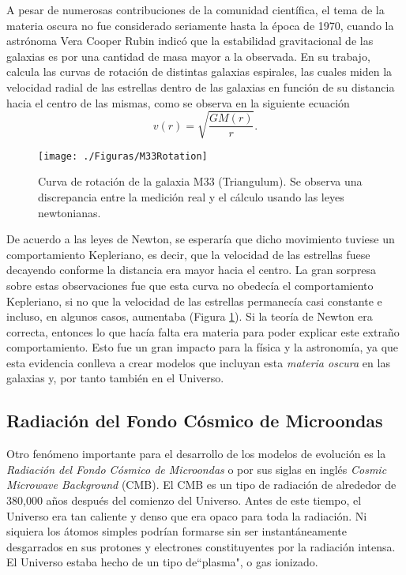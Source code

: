 \documentclass[a4paper,openright,12pt]{book}
\begin{document}
A pesar de numerosas contribuciones de la comunidad científica, el tema de la materia oscura no fue considerado seriamente hasta la época de 1970, cuando la astrónoma Vera Cooper Rubin \cite{1.1.2} indicó que la estabilidad gravitacional de las galaxias es por una cantidad de masa mayor a la observada. En su trabajo, calcula las curvas de rotación de distintas galaxias espirales, las cuales miden la velocidad radial de las estrellas dentro de las galaxias en función de su distancia hacia el centro de las mismas, como se observa en la siguiente ecuación
\begin{equation}
v (r)
=
\sqrt{\frac{G M (r)}{r}}.\label{eqn 1.42}
\end{equation} 
\begin{figure}
\centering
    \texttt{[image: ./Figuras/M33Rotation]}
  \caption{\footnotesize{Curva de rotación de la galaxia M33 (Triangulum). Se observa una discrepancia entre la medición real y el cálculo usando las leyes newtonianas.}}
  \label{fig 1.2}
\end{figure}
De acuerdo a las leyes de Newton, se esperaría que dicho movimiento tuviese un comportamiento Kepleriano, es decir, que la velocidad de las estrellas fuese decayendo conforme la distancia era mayor hacia el centro. La gran sorpresa sobre estas observaciones fue que esta curva no obedecía el comportamiento Kepleriano, si no que la velocidad de las estrellas permanecía casi constante e incluso, en algunos casos, aumentaba (Figura \ref{fig 1.2}). Si la teoría de Newton era correcta, entonces lo que hacía falta era materia para poder explicar este extraño comportamiento. Esto fue un gran impacto para la física y la astronomía, ya que esta evidencia conlleva a crear modelos que incluyan esta \textit{materia oscura} en las galaxias y, por tanto también en el Universo.

\subsection*{Radiación del Fondo Cósmico de Microondas}
Otro fenómeno importante para el desarrollo de los modelos de evolución es la \textit{Radiación del Fondo Cósmico de Microondas} o por sus siglas en inglés \textit{Cosmic Microwave Background} (CMB). El CMB es un tipo de radiación de alrededor de 380,000 años después del comienzo del Universo. Antes de este tiempo, el Universo era tan caliente y denso que era opaco para toda la radiación. Ni siquiera los átomos simples podrían formarse sin ser instantáneamente desgarrados en sus protones y electrones constituyentes por la radiación intensa. El Universo estaba hecho de un tipo de``plasma", o gas ionizado.
\end{document}
